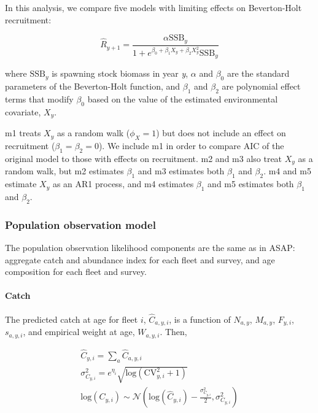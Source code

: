 \documentclass[]{article}
\let\oldparagraph\paragraph
\renewcommand{\paragraph}[1]{\oldparagraph{#1}\mbox{}}
\begin{document}
In this analysis, we compare five models with limiting effects on
Beverton-Holt recruitment:

\[\hat{R}_{y+1} = \frac{\alpha \text{SSB}_{y}}{1 + e^{\beta_0 + \beta_1 X_{y} + \beta_2 X^2_{y}} \text{SSB}_y}\]

where \(\text{SSB}_y\) is spawning stock biomass in year \emph{y},
\(\alpha\) and \(\beta_0\) are the standard parameters of the
Beverton-Holt function, and \(\beta_1\) and \(\beta_2\) are polynomial
effect terms that modify \(\beta_0\) based on the value of the estimated
environmental covariate, \(X_y\).

m1 treats \(X_y\) as a random walk (\(\phi_X = 1\)) but does not include
an effect on recruitment (\(\beta_1 = \beta_2 = 0\)). We include m1 in
order to compare AIC of the original model to those with effects on
recruitment. m2 and m3 also treat \(X_y\) as a random walk, but m2
estimates \(\beta_1\) and m3 estimates both \(\beta_1\) and \(\beta_2\).
m4 and m5 estimate \(X_y\) as an AR1 process, and m4 estimates
\(\beta_1\) and m5 estimates both \(\beta_1\) and \(\beta_2\).

\hypertarget{population-observation-model}{%
\subsubsection{Population observation
model}\label{population-observation-model}}

The population observation likelihood components are the same as in
ASAP: aggregate catch and abundance index for each fleet and survey, and
age composition for each fleet and survey.

\hypertarget{catch}{%
\paragraph{Catch}\label{catch}}

The predicted catch at age for fleet \(i\), \(\hat{C}_{a,y,i}\), is a
function of \(N_{a,y}\), \(M_{a,y}\), \(F_{y,i}\), \(s_{a,y,i}\), and
empirical weight at age, \(W_{a,y,i}\). Then,

\begin{equation}
\label{eq:catch}
  \begin{array}{ccc}
    \hat{C}_{y,i} = \sum_a \hat{C}_{a,y,i} \\
    \sigma^2_{C_{y,i}} = e^{\eta_i} \sqrt{\text{log}(\text{CV}^2_{y,i} + 1)} \\  
    \text{log}(C_{y,i}) \sim \mathcal{N}\left( \text{log}(\hat{C}_{y,i}) - \frac{\sigma^2_{C_{y,i}}}{2}, \sigma^2_{C_{y,i}}\right)
  \end{array}
\end{equation}
\end{document}
